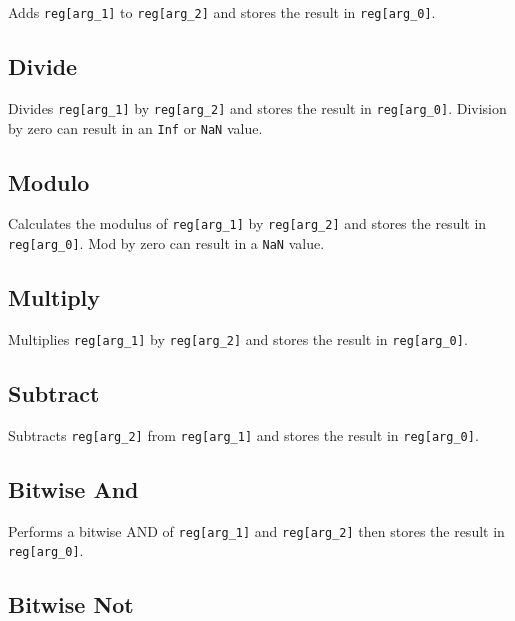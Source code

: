 
Adds \texttt{reg[arg\_1]} to \texttt{reg[arg\_2]} and stores the result in \texttt{reg[arg\_0]}.

\subsection{Divide}


Divides \texttt{reg[arg\_1]} by \texttt{reg[arg\_2]} and stores the result in \texttt{reg[arg\_0]}.
Division by zero can result in an \texttt{Inf} or \texttt{NaN} value.

\subsection{Modulo}


Calculates the modulus of \texttt{reg[arg\_1]} by \texttt{reg[arg\_2]} and stores the result in \texttt{reg[arg\_0]}.
Mod by zero can result in a \texttt{NaN} value.

\subsection{Multiply}


Multiplies \texttt{reg[arg\_1]} by \texttt{reg[arg\_2]} and stores the result in \texttt{reg[arg\_0]}.

\subsection{Subtract}


Subtracts \texttt{reg[arg\_2]} from \texttt{reg[arg\_1]} and stores the result in \texttt{reg[arg\_0]}.

\subsection{Bitwise And}


Performs a bitwise AND of \texttt{reg[arg\_1]} and \texttt{reg[arg\_2]} then stores the result in \texttt{reg[arg\_0]}.

\subsection{Bitwise Not}

